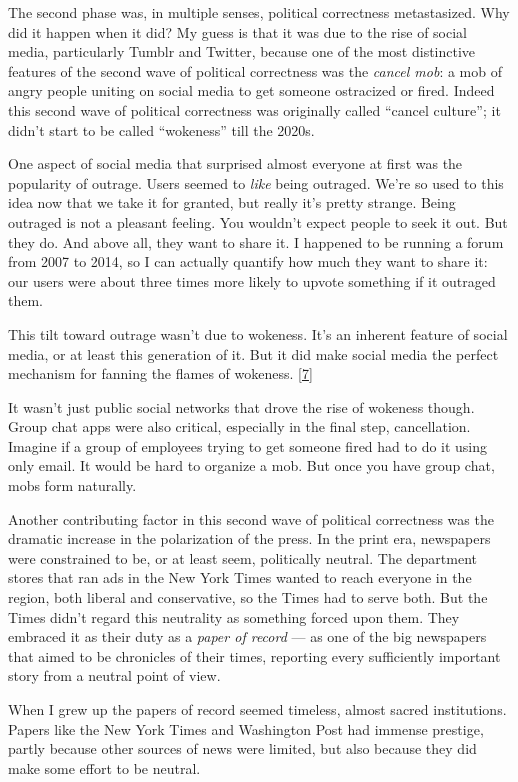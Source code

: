 The second phase was, in multiple senses, political correctness
metastasized. Why did it happen when it did? My guess is that it was due
to the rise of social media, particularly Tumblr and Twitter, because
one of the most distinctive features of the second wave of political
correctness was the \emph{cancel mob}: a mob of angry people uniting on
social media to get someone ostracized or fired. Indeed this second wave
of political correctness was originally called ``cancel culture''; it
didn't start to be called ``wokeness'' till the 2020s.

One aspect of social media that surprised almost everyone at first was
the popularity of outrage. Users seemed to \emph{like} being outraged.
We're so used to this idea now that we take it for granted, but really
it's pretty strange. Being outraged is not a pleasant feeling. You
wouldn't expect people to seek it out. But they do. And above all, they
want to share it. I happened to be running a forum from 2007 to 2014, so
I can actually quantify how much they want to share it: our users were
about three times more likely to upvote something if it outraged them.

This tilt toward outrage wasn't due to wokeness. It's an inherent
feature of social media, or at least this generation of it. But it did
make social media the perfect mechanism for fanning the flames of
wokeness. {[}\hyperref[f7n]{7}{]}

It wasn't just public social networks that drove the rise of wokeness
though. Group chat apps were also critical, especially in the final
step, cancellation. Imagine if a group of employees trying to get
someone fired had to do it using only email. It would be hard to
organize a mob. But once you have group chat, mobs form naturally.

Another contributing factor in this second wave of political correctness
was the dramatic increase in the polarization of the press. In the print
era, newspapers were constrained to be, or at least seem, politically
neutral. The department stores that ran ads in the New York Times wanted
to reach everyone in the region, both liberal and conservative, so the
Times had to serve both. But the Times didn't regard this neutrality as
something forced upon them. They embraced it as their duty as a
\emph{paper of record} --- as one of the big newspapers that aimed to be
chronicles of their times, reporting every sufficiently important story
from a neutral point of view.

When I grew up the papers of record seemed timeless, almost sacred
institutions. Papers like the New York Times and Washington Post had
immense prestige, partly because other sources of news were limited, but
also because they did make some effort to be neutral.

